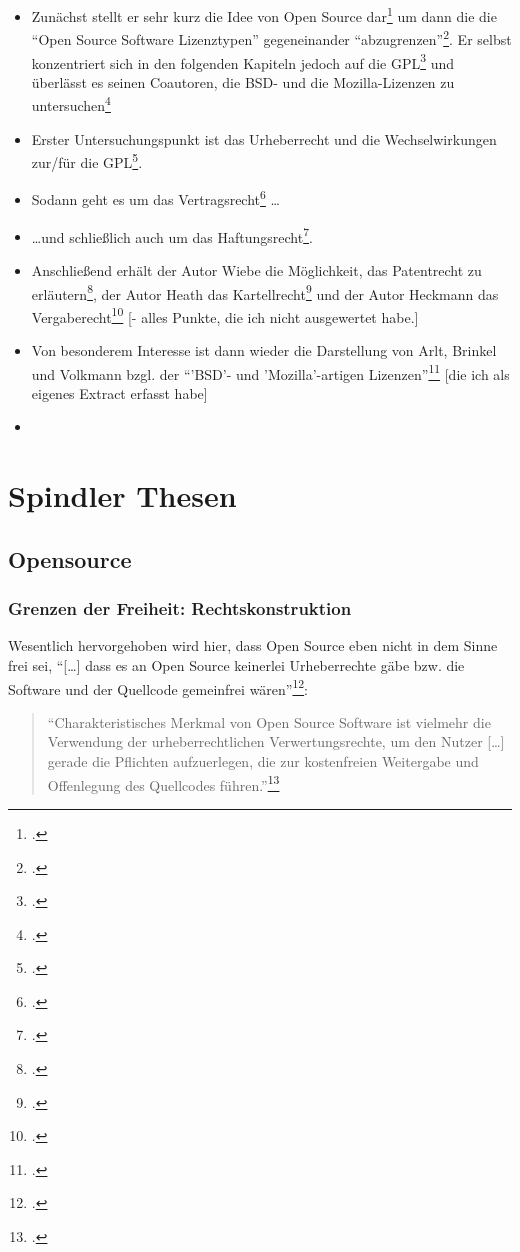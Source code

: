 \documentclass[DIV=calc,BCOR=5mm,11pt,headings=small,oneside,abstract=true, toc=bib]{scrartcl}
\begin{document}
\begin{itemize}
  \item Zunächst stellt er sehr kurz die Idee von Open Source
  dar\footcite[vgl.][1ff]{Spindler2004a} um dann die die \enquote{Open Source
  Software Lizenztypen} gegeneinander
  \enquote{abzugrenzen}\footcite[vgl.][9ff]{Spindler2004a}. Er selbst
  konzentriert sich in den folgenden Kapiteln jedoch auf die
  GPL\footcite[vgl.][21ff]{Spindler2004a} und überlässt es seinen Coautoren, die
  BSD- und die Mozilla-Lizenzen zu
  untersuchen\footcite[vgl.][317ff]{Spindler2004a}
  \item Erster Untersuchungspunkt ist das Urheberrecht und die Wechselwirkungen
  zur/für die GPL\footcite[vgl.][21ff]{Spindler2004a}.
  \item Sodann geht es um das Vertragsrecht\footcite[vgl.][151ff]{Spindler2004a}
  \ldots
  \item \ldots und schließlich auch um das
  Haftungsrecht\footcite[vgl.][151ff]{Spindler2004a}.
  \item Anschließend erhält der Autor Wiebe die Möglichkeit, das Patentrecht zu
  erläutern\footcite[vgl.][223ff]{Spindler2004a}, der Autor Heath das
  Kartellrecht\footcite[vgl.][267]{Spindler2004a} und der Autor Heckmann das
  Vergaberecht\footcite[vgl.][281ff]{Spindler2004a} [- alles Punkte, die ich
  nicht ausgewertet habe.]
  \item Von besonderem Interesse ist dann wieder die Darstellung von Arlt,
  Brinkel und Volkmann bzgl. der \enquote{'BSD'- und 'Mozilla'-artigen
  Lizenzen}\footcite[vgl.][317ff]{Spindler2004a} [die ich als eigenes
  Extract erfasst habe]
  \item 
\end{itemize}


\section{Spindler Thesen}

\subsection{Opensource}

\subsubsection{Grenzen der Freiheit: Rechtskonstruktion}

Wesentlich hervorgehoben wird hier, dass Open Source eben nicht in dem Sinne
frei sei, \enquote{[\ldots] dass es an Open Source keinerlei Urheberrechte
gäbe bzw. die Software und der Quellcode gemeinfrei
wären}\footcite[vgl.][2]{Spindler2004a}:
\begin{quote}\enquote{Charakteristisches Merkmal von Open Source Software
ist vielmehr die Verwendung der urheberrechtlichen Verwertungsrechte, um
den Nutzer [\ldots] gerade die Pflichten aufzuerlegen, die zur
kostenfreien Weitergabe und Offenlegung des Quellcodes
führen.}\footcite[][2]{Spindler2004a}
\end{quote}
\end{document}
